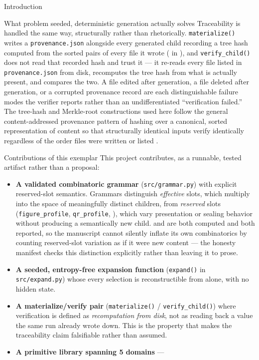 \documentclass[
  ignorenonframetext,
]{beamer}
\providecommand{\tightlist}{%
  \setlength{\itemsep}{0pt}\setlength{\parskip}{0pt}}
\begin{document}
\begin{frame}{Introduction}
\begin{block}{What problem seeded, deterministic generation actually
solves}
Traceability is handled the same way, structurally rather than
rhetorically. \texttt{materialize()} writes a \texttt{provenance.json}
alongside every generated child recording a tree hash computed from the
sorted  pairs of every file it wrote
( in
), and \texttt{verify\_child()} does not read
that recorded hash and trust it --- it re-reads every file listed in
\texttt{provenance.json} from disk, recomputes the tree hash from what
is actually present, and compares the two. A file edited after
generation, a file deleted after generation, or a corrupted provenance
record are each distinguishable failure modes the verifier reports
rather than an undifferentiated ``verification failed.'' The tree-hash
and Merkle-root constructions used here follow the general
content-addressed provenance pattern of hashing over a canonical, sorted
representation of content so that structurally identical inputs verify
identically regardless of the order files were written or listed
.
\end{block}

\begin{block}{Contributions of this exemplar}
\protect{}\label{contributions-of-this-exemplar}
This project contributes, as a runnable, tested artifact rather than a
proposal:

\begin{itemize}
\tightlist
\item
  \textbf{A validated combinatoric grammar} (\texttt{src/grammar.py})
  with explicit reserved-slot semantics. Grammars distinguish
  \emph{effective} slots, which multiply into the space of meaningfully
  distinct children, from \emph{reserved} slots
  (\texttt{figure\_profile}, \texttt{qr\_profile},
  ), which vary presentation or sealing
  behavior without producing a semantically new child.
   and
   are both computed and both
  reported, so the manuscript cannot silently inflate its own
  combinatorics by counting reserved-slot variation as if it were new
  content --- the honesty manifest checks this distinction explicitly
  rather than leaving it to prose.
\item
  \textbf{A seeded, entropy-free expansion function} (\texttt{expand()}
  in \texttt{src/expand.py}) whose every selection is reconstructible
  from  alone, with no
  hidden state.
\item
  \textbf{A materialize/verify pair} (\texttt{materialize()} /
  \texttt{verify\_child()}) where verification is defined as
  \emph{recomputation from disk}, not as reading back a value the same
  run already wrote down. This is the property that makes the
  traceability claim falsifiable rather than assumed.
\item
  \textbf{A primitive library spanning 5 domains} ---


\end{itemize}
\end{block}
\end{frame}
\end{document}
